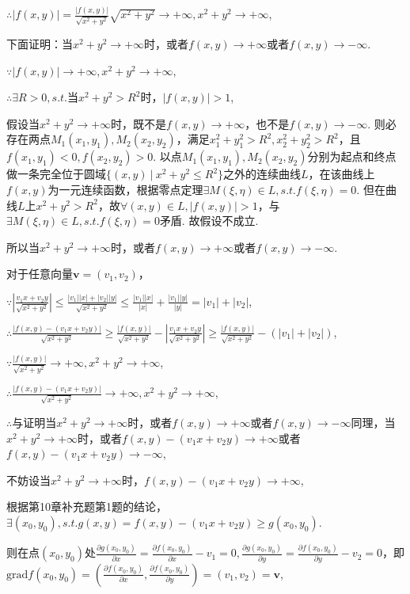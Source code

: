 \documentclass[12pt,UTF8]{ctexart}
\newcommand\Set[2]{\{#1\ \vert\ #2 \}}
\begin{document}
\begin{enumerate}
$\therefore|f(x,y)|=\frac{|f(x,y)|}{\sqrt{x^2+y^2}}\sqrt{x^2+y^2}\rightarrow+\infty,x^2+y^2\rightarrow+\infty$,

下面证明：当$x^2+y^2\rightarrow+\infty$时，或者$f(x,y)\rightarrow+\infty$或者$f(x,y)\rightarrow-\infty$.

$\because|f(x,y)|\rightarrow+\infty,x^2+y^2\rightarrow+\infty$,

$\therefore\exists R>0,s.t.$当$x^2+y^2>R^2$时，$|f(x,y)|>1$,

假设当$x^2+y^2\rightarrow+\infty$时，既不是$f(x,y)\rightarrow+\infty$，也不是$f(x,y)\rightarrow-\infty$. 则必存在两点$M_1(x_1,y_1),M_2(x_2,y_2)$，满足$x_1^2+y_1^2>R^2,x_2^2+y_2^2>R^2$，且$f(x_1,y_1)<0,f(x_2,y_2)>0$. 以点$M_1(x_1,y_1),M_2(x_2,y_2)$分别为起点和终点做一条完全位于圆域$\Set{(x,y)}{x^2+y^2\leq R^2}$之外的连续曲线$L$，在该曲线上$f(x,y)$为一元连续函数，根据零点定理$\exists M(\xi,\eta)\in L,s.t.f(\xi,\eta)=0$. 但在曲线$L$上$x^2+y^2>R^2$，故$\forall(x,y)\in L,|f(x,y)|>1$，与$\exists M(\xi,\eta)\in L,s.t.f(\xi,\eta)=0$矛盾. 故假设不成立. 

所以当$x^2+y^2\rightarrow+\infty$时，或者$f(x,y)\rightarrow+\infty$或者$f(x,y)\rightarrow-\infty$.

对于任意向量$\bm v=(v_1,v_2)$，

$\because|\frac{v_1x+v_2y}{\sqrt{x^2+y^2}}|\leq\frac{|v_1||x|+|v_2||y|}{\sqrt{x^2+y^2}}\leq\frac{|v_1||x|}{|x|}+\frac{|v_1||y|}{|y|}=|v_1|+|v_2|$,

$\therefore\frac{|f(x,y)-(v_1x+v_2y)|}{\sqrt{x^2+y^2}}\geq\frac{|f(x,y)|}{\sqrt{x^2+y^2}}-|\frac{v_1x+v_2y}{\sqrt{x^2+y^2}}|\geq\frac{|f(x,y)|}{\sqrt{x^2+y^2}}-(|v_1|+|v_2|)$,

$\because\frac{|f(x,y)|}{\sqrt{x^2+y^2}}\rightarrow+\infty,x^2+y^2\rightarrow+\infty$,

$\therefore\frac{|f(x,y)-(v_1x+v_2y)|}{\sqrt{x^2+y^2}}\rightarrow+\infty,x^2+y^2\rightarrow+\infty$,

$\therefore$与证明当$x^2+y^2\rightarrow+\infty$时，或者$f(x,y)\rightarrow+\infty$或者$f(x,y)\rightarrow-\infty$同理，当$x^2+y^2\rightarrow+\infty$时，或者$f(x,y)-(v_1x+v_2y)\rightarrow+\infty$或者$f(x,y)-(v_1x+v_2y)\rightarrow-\infty$,

不妨设当$x^2+y^2\rightarrow+\infty$时，$f(x,y)-(v_1x+v_2y)\rightarrow+\infty$,

根据第10章补充题第1题的结论，$\exists(x_0,y_0),s.t.g(x,y)=f(x,y)-(v_1x+v_2y)\geq g(x_0,y_0)$. 

则在点$(x_0,y_0)$处$\frac{\partial g(x_0,y_0)}{\partial x}=\frac{\partial f(x_0,y_0)}{\partial x}-v_1=0,\frac{\partial g(x_0,y_0)}{\partial y}=\frac{\partial f(x_0,y_0)}{\partial y}-v_2=0$，即$\mathrm{grad}f(x_0,y_0)=(\frac{\partial f(x_0,y_0)}{\partial x},\frac{\partial f(x_0,y_0)}{\partial y})=(v_1,v_2)=\bm v$,


\end{enumerate}
\end{document}
